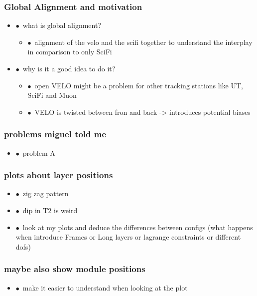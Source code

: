 \documentclass[aspectratio=1610, 12pt, xcolor=dvipsnames]{beamer}
\begin{document}
\begin{frame}\frametitle{Global Alignment and motivation}
  \begin{itemize}
    \setlength\itemsep{0em}
    \item $\bullet$\, what is global alignment?
    \begin{itemize}
      \item $\bullet$\, alignment of the velo and the scifi together to understand the interplay in comparison to only SciFi
    \end{itemize}
    \item $\bullet$\, why is it a good idea to do it?
    \begin{itemize}
      \item $\bullet$\, open VELO might be a problem for other tracking stations like UT, SciFi and Muon
      \item $\bullet$\, VELO is twisted between fron and back -> introduces potential biases
    \end{itemize}
  \end{itemize}
\end{frame}

\begin{frame}\frametitle{problems miguel told me}
  \begin{itemize}
    \setlength\itemsep{0em}
    \item $\bullet$\, problem A
  \end{itemize}
\end{frame}

\begin{frame}\frametitle{plots about layer positions}
  \begin{itemize}
    \setlength\itemsep{0em}
    \item $\bullet$\, zig zag pattern
    \item $\bullet$\, dip in T2 is weird
    \item $\bullet$\, look at my plots and deduce the differences between configs (what happens when introduce Frames or Long layers or lagrange constraints or different dofs)
  \end{itemize}
\end{frame}

\begin{frame}\frametitle{maybe also show module positions}
  \begin{itemize}
    \setlength\itemsep{0em}
    \item $\bullet$\, make it easier to understand when looking at the plot
  \end{itemize}
\end{frame}
\end{document}
